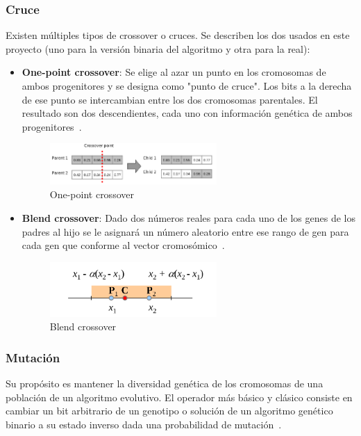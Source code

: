 \subsubsection{Cruce}
Existen múltiples tipos de crossover o cruces. Se describen los dos usados en este proyecto (uno para la versión binaria del algoritmo y otra para la real):
\begin{itemize}
    \item \textbf{One-point crossover}: Se elige al azar un punto en los cromosomas de ambos progenitores y se designa como "punto de cruce". Los bits a la derecha de ese punto se intercambian entre los dos cromosomas parentales. El resultado son dos descendientes, cada uno con información genética de ambos progenitores~\cite{DAGDIA2020283}.
          \begin{figure}[H]
              \begin{center}
                  \includegraphics[width=0.6\textwidth]{imagenes/one-point-crossover.png}
              \end{center}
              \caption[One point crossover]{One-point crossover~\cite{purduelecture}}
          \end{figure}
    \item \textbf{Blend crossover}: Dado dos números reales para cada uno de los genes de los padres al hijo se le asignará un número aleatorio entre ese rango de gen para cada gen que conforme al vector cromosómico~\cite{purduelecture}.
          \begin{figure}[H]
              \begin{center}
                  \includegraphics[width=0.6\textwidth]{imagenes/blend-crossover.png}
              \end{center}
              \caption[Blend crossover]{Blend crossover~\cite{purduelecture}}
          \end{figure}
\end{itemize}

\subsubsection{Mutación}
Su propósito es mantener la diversidad genética de los cromosomas de una población de un algoritmo evolutivo.
El operador más básico y clásico consiste en cambiar un bit arbitrario de un genotipo o solución de un algoritmo genético binario a su estado inverso dada una probabilidad de mutación~\cite{mirjalili2019genetic}.

